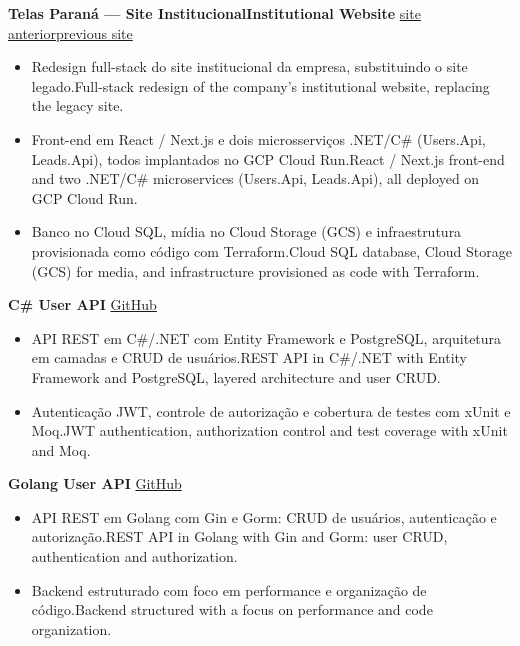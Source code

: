 \documentclass[a4paper,10pt]{article}
\newcommand{\tr}[2]{\ifdefined\CVPT #2\else #1\fi}
\newcommand{\project}[2]{
  \noindent\textbf{#1} \hfill #2 \\
  \vspace{2pt}
}
\begin{document}
\project{Telas Paraná --- \tr{Institutional Website}{Site Institucional}}{\href{https://telasearamesparana.com.br}{\faLink \space \tr{previous site}{site anterior}}}
\vspace{-0.4em}
\begin{itemize}[leftmargin=*, itemsep=2pt]
\setlength\itemsep{0em}
\item \tr{Full-stack redesign of the company's institutional website, replacing the legacy site.}{Redesign full-stack do site institucional da empresa, substituindo o site legado.}
\item \tr{React / Next.js front-end and two .NET/C\# microservices (Users.Api, Leads.Api), all deployed on GCP Cloud Run.}{Front-end em React / Next.js e dois microsserviços .NET/C\# (Users.Api, Leads.Api), todos implantados no GCP Cloud Run.}
\item \tr{Cloud SQL database, Cloud Storage (GCS) for media, and infrastructure provisioned as code with Terraform.}{Banco no Cloud SQL, mídia no Cloud Storage (GCS) e infraestrutura provisionada como código com Terraform.}
\end{itemize}

\project{C\# User API}{\href{https://github.com/H0wZy/UserApi}{\faLink \space GitHub}}
\vspace{-0.4em}
\begin{itemize}[leftmargin=*, itemsep=2pt]
\setlength\itemsep{0em}
\item \tr{REST API in C\#/.NET with Entity Framework and PostgreSQL, layered architecture and user CRUD.}{API REST em C\#/.NET com Entity Framework e PostgreSQL, arquitetura em camadas e CRUD de usuários.}
\item \tr{JWT authentication, authorization control and test coverage with xUnit and Moq.}{Autenticação JWT, controle de autorização e cobertura de testes com xUnit e Moq.}
\end{itemize}

\project{Golang User API}{\href{https://github.com/H0wZy/user-api}{\faLink \space GitHub}}
\vspace{-0.4em}
\begin{itemize}[leftmargin=*, itemsep=2pt]
\setlength\itemsep{0em}
\item \tr{REST API in Golang with Gin and Gorm: user CRUD, authentication and authorization.}{API REST em Golang com Gin e Gorm: CRUD de usuários, autenticação e autorização.}
\item \tr{Backend structured with a focus on performance and code organization.}{Backend estruturado com foco em performance e organização de código.}
\end{itemize}
\end{document}
